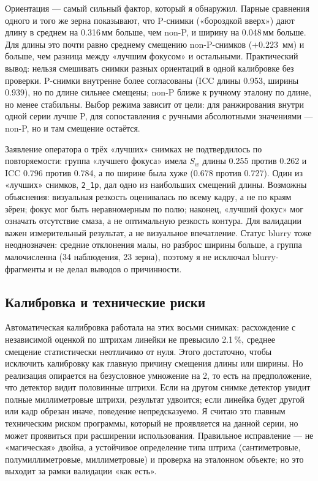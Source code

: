 \documentclass[12pt,a4paper]{article}
\begin{document}
Ориентация — самый сильный фактор, который я обнаружил. Парные сравнения
одного и того же зерна показывают, что P-снимки («бороздкой вверх») дают
длину в среднем на \num{0.316}\,мм больше, чем non-P, и ширину на
\num{0.048}\,мм больше. Для длины это почти равно среднему смещению
non-P-снимков ($+\num{0.223}$~мм) и больше, чем разница между
«лучшим фокусом» и остальными. Практический вывод: нельзя смешивать
снимки разных ориентаций в одной калибровке без проверки. P-снимки
внутренне более согласованы (ICC длины \num{0.953}, ширины
\num{0.939}), но по длине сильнее смещены; non-P ближе к ручному
эталону по длине, но менее стабильны. Выбор режима зависит от цели: для
ранжирования внутри одной серии лучше P, для сопоставления с ручными
абсолютными значениями — non-P, но и там смещение остаётся.

Заявление оператора о трёх «лучших» снимках не подтвердилось по
повторяемости: группа «лучшего фокуса» имела $S_w$ длины \num{0.255}
против \num{0.262} и ICC \num{0.796} против \num{0.784}, а по ширине
была хуже (\num{0.678} против \num{0.727}). Один из «лучших» снимков,
\texttt{2\_1p}, дал одно из наибольших смещений длины. Возможны
объяснения: визуальная резкость оценивалась по всему кадру, а не по
краям зёрен; фокус мог быть неравномерным по полю; наконец, «лучший
фокус» мог означать отсутствие смаза, а не оптимальную резкость
контура. Для валидации важен измерительный результат, а не визуальное
впечатление. Статус blurry тоже неоднозначен: средние отклонения малы,
но разброс ширины больше, а группа малочисленна (\num{34} наблюдения,
\num{23} зерна), поэтому я не исключал blurry-фрагменты и не делал
выводов о причинности.

\subsection{Калибровка и технические риски}

Автоматическая калибровка работала на этих восьми снимках: расхождение
с независимой оценкой по штрихам линейки не превысило \num{2.1}\,\%,
среднее смещение статистически неотличимо от нуля. Этого достаточно,
чтобы исключить калибровку как главную причину смещения длины или
ширины. Но реализация опирается на безусловное умножение на 2, то есть
на предположение, что детектор видит половинные штрихи. Если на другом
снимке детектор увидит полные миллиметровые штрихи, результат
удвоится; если линейка будет другой или кадр обрезан иначе, поведение
непредсказуемо. Я считаю это главным техническим риском программы,
который не проявляется на данной серии, но может проявиться при
расширении использования. Правильное исправление — не «магическая»
двойка, а устойчивое определение типа штриха (сантиметровые,
полумиллиметровые, миллиметровые) и проверка на эталонном объекте; но это
выходит за рамки валидации «как есть».
\end{document}
